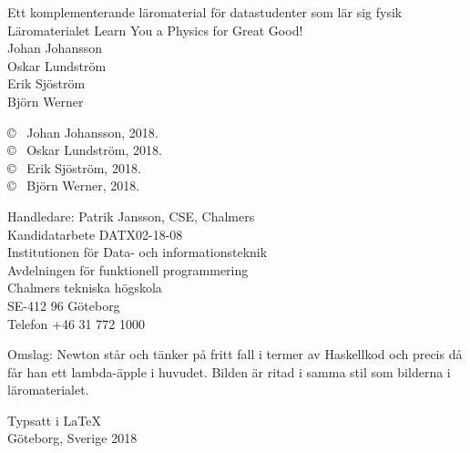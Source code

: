 \newpage
\thispagestyle{plain}
\vspace*{0cm}
Ett komplementerande läromaterial för datastudenter som lär sig fysik\\
Läromaterialet Learn You a Physics for Great Good!\\
Johan Johansson \\
Oskar Lundström \\
Erik Sjöström \\
Björn Werner
\setlength{\parskip}{1cm}

\copyright ~ Johan Johansson, 2018. \setlength{\parskip}{1cm} \\
\copyright ~ Oskar Lundström, 2018. \setlength{\parskip}{1cm} \\
\copyright ~ Erik Sjöström, 2018. \setlength{\parskip}{1cm} \\
\copyright ~ Björn Werner, 2018. \setlength{\parskip}{1cm}

Handledare: Patrik Jansson, CSE, Chalmers\\

Kandidatarbete DATX02-18-08 \\
Institutionen för Data- och informationsteknik \\
Avdelningen för funktionell programmering\\
Chalmers tekniska högskola\\
SE-412 96 Göteborg\\
Telefon +46 31 772 1000
\setlength{\parskip}{0.5cm}%

\vfill
Omslag: Newton står och tänker på fritt fall i termer av Haskellkod och precis då får han ett lambda-äpple i huvudet. Bilden är ritad i samma stil som bilderna i läromaterialet.

Typsatt i \LaTeX \\
Göteborg, Sverige 2018
